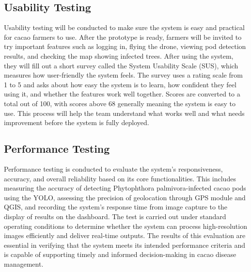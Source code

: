 \subsection{Usability Testing}
Usability testing will be conducted to make sure the system is easy and practical for cacao farmers to use. After the prototype is ready, farmers will be invited to try important features such as logging in, flying the drone, viewing pod detection results, and checking the map showing infected trees. After using the system, they will fill out a short survey called the System Usability Scale (SUS), which measures how user-friendly the system feels. The survey uses a rating scale from 1 to 5 and asks about how easy the system is to learn, how confident they feel using it, and whether the features work well together. Scores are converted to a total out of 100, with scores above 68 generally meaning the system is easy to use. This process will help the team understand what works well and what needs improvement before the system is fully deployed.

\subsection{Performance Testing}

Performance testing is conducted to evaluate the system’s responsiveness, accuracy, and overall reliability based on its core functionalities. This includes measuring the accuracy of detecting Phytophthora palmivora-infected cacao pods using the YOLO, assessing the precision of geolocation through GPS module and QGIS, and recording the system’s response time from image capture to the display of results on the dashboard. The test is carried out under standard operating conditions to determine whether the system can process high-resolution images efficiently and deliver real-time outputs. The results of this evaluation are essential in verifying that the system meets its intended performance criteria and is capable of supporting timely and informed decision-making in cacao disease management.
